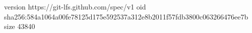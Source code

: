 version https://git-lfs.github.com/spec/v1
oid sha256:584a1064a00fe78125d175e592537a312e8b2011f57fdb3800c063266476ee7b
size 43840
